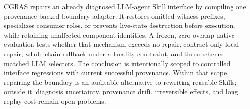 \documentclass[10pt]{article}
\begin{document}
CGBAS repairs an already diagnosed LLM-agent Skill interface by compiling one
provenance-backed boundary adapter. It restores omitted witness prefixes,
specializes consumer roles, or prevents live-state destruction before execution,
while retaining unaffected component identities. A frozen, zero-overlap native
evaluation tests whether that mechanism exceeds no repair, contract-only local
repair, whole-chain rollback under a locality constraint, and three schema-matched
LLM selectors. The conclusion is intentionally scoped to controlled interface
regressions with current successful provenance. Within that scope, repairing the
boundary is an auditable alternative to rewriting reusable Skills; outside it,
diagnosis uncertainty, provenance drift, irreversible effects, and long replay
cost remain open problems.



\end{document}
